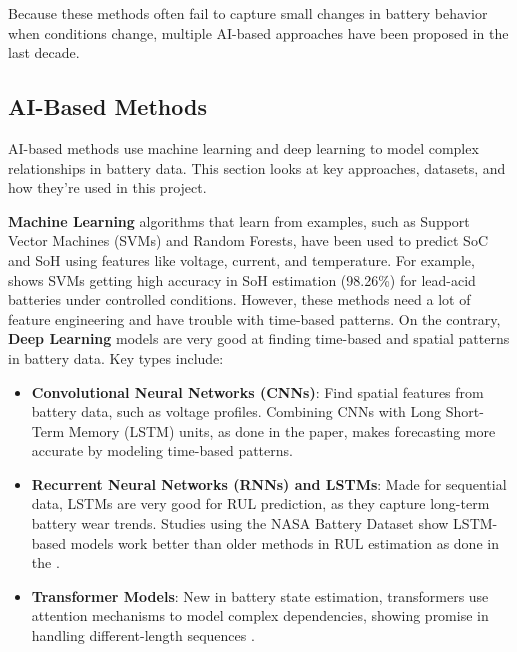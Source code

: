 Because these methods often fail to capture small changes in battery behavior when conditions change, multiple AI-based approaches have been proposed in the last decade.

\subsection{AI-Based Methods}
\label{subsec:ai_methods}
AI-based methods use machine learning and deep learning to model complex relationships in battery data. This section looks at key approaches, datasets, and how they're used in this project.

\textbf{Machine Learning} algorithms that learn from examples, such as Support Vector Machines (SVMs) and Random Forests, have been used to predict SoC and SoH using features like voltage, current, and temperature. For example, \cite{sun_simultaneous_2022} shows SVMs getting high accuracy in SoH estimation (98.26\%) for lead-acid batteries under controlled conditions. However, these methods need a lot of feature engineering and have trouble with time-based patterns. On the contrary, \textbf{Deep Learning} models are very good at finding time-based and spatial patterns in battery data. Key types include:
\begin{itemize}
    \item \textbf{Convolutional Neural Networks (CNNs)}: Find spatial features from battery data, such as voltage profiles. Combining CNNs with Long Short-Term Memory (LSTM) units, as done in the \cite{Fangfang_Yang} paper, makes forecasting more accurate by modeling time-based patterns.
    \item \textbf{Recurrent Neural Networks (RNNs) and LSTMs}: Made for sequential data, LSTMs are very good for RUL prediction, as they capture long-term battery wear trends. Studies using the NASA Battery Dataset \cite{noauthor_nasa_nodate} show LSTM-based models work better than older methods in RUL estimation as done in the \cite{hong_state--health_2023}.
    \item \textbf{Transformer Models}: New in battery state estimation, transformers use attention mechanisms to model complex dependencies, showing promise in handling different-length sequences \cite{yilmaz_transformer-based_2025}.
\end{itemize}

